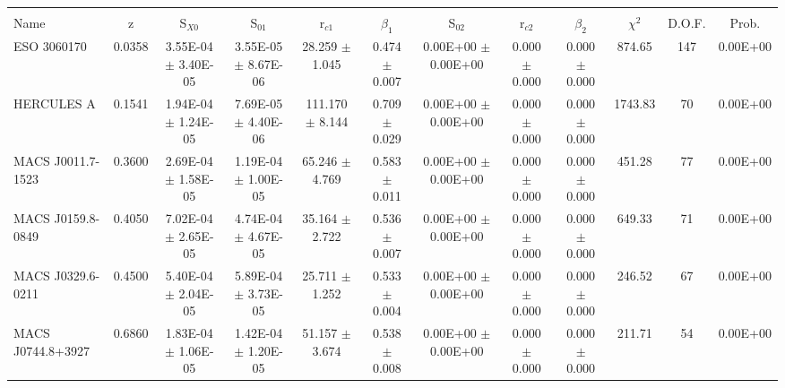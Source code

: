 \documentclass{article}
\begin{document}
\begin{landscape}
\scriptsize
\begin{center}
\begin{longtable}{lccccccccccc}
\hline \hline\\
Name & z & S$_{X0}$ & S$_{01}$ & r$_{c1}$ & $\beta_1$ & S$_{02}$ & r$_{c2}$ & $\beta_2$ & $\chi^2$ & D.O.F. & Prob.\\
\hline
ESO 3060170         \dotfill &  0.0358     &     3.55E-04  $\pm$    3.40E-05     &     3.55E-05  $\pm$    8.67E-06     &       28.259  $\pm$       1.045     &        0.474  $\pm$       0.007     &     0.00E+00  $\pm$    0.00E+00     &        0.000  $\pm$       0.000     &        0.000  $\pm$       0.000     &   874.65 &   147 &     0.00E+00\\
HERCULES A          \dotfill &  0.1541     &     1.94E-04  $\pm$    1.24E-05     &     7.69E-05  $\pm$    4.40E-06     &      111.170  $\pm$       8.144     &        0.709  $\pm$       0.029     &     0.00E+00  $\pm$    0.00E+00     &        0.000  $\pm$       0.000     &        0.000  $\pm$       0.000     &  1743.83 &    70 &     0.00E+00\\
MACS J0011.7-1523   \dotfill &  0.3600     &     2.69E-04  $\pm$    1.58E-05     &     1.19E-04  $\pm$    1.00E-05     &       65.246  $\pm$       4.769     &        0.583  $\pm$       0.011     &     0.00E+00  $\pm$    0.00E+00     &        0.000  $\pm$       0.000     &        0.000  $\pm$       0.000     &   451.28 &    77 &     0.00E+00\\
MACS J0159.8-0849   \dotfill &  0.4050     &     7.02E-04  $\pm$    2.65E-05     &     4.74E-04  $\pm$    4.67E-05     &       35.164  $\pm$       2.722     &        0.536  $\pm$       0.007     &     0.00E+00  $\pm$    0.00E+00     &        0.000  $\pm$       0.000     &        0.000  $\pm$       0.000     &   649.33 &    71 &     0.00E+00\\
MACS J0329.6-0211   \dotfill &  0.4500     &     5.40E-04  $\pm$    2.04E-05     &     5.89E-04  $\pm$    3.73E-05     &       25.711  $\pm$       1.252     &        0.533  $\pm$       0.004     &     0.00E+00  $\pm$    0.00E+00     &        0.000  $\pm$       0.000     &        0.000  $\pm$       0.000     &   246.52 &    67 &     0.00E+00\\
MACS J0744.8+3927   \dotfill &  0.6860     &     1.83E-04  $\pm$    1.06E-05     &     1.42E-04  $\pm$    1.20E-05     &       51.157  $\pm$       3.674     &        0.538  $\pm$       0.008     &     0.00E+00  $\pm$    0.00E+00     &        0.000  $\pm$       0.000     &        0.000  $\pm$       0.000     &   211.71 &    54 &     0.00E+00\\

\end{longtable}
\end{center}
\end{landscape}
\end{document}

